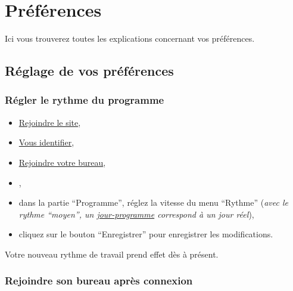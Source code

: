 % 
% 
% 
% 
% 
% 
% 
% 

\chapter{Préférences}\hypertarget{preferences-auteur}{}\label{preferences-auteur}

Ici vous trouverez toutes les explications concernant vos préférences.

\section{Réglage de vos préférences}\hypertarget{reglage-preferences}{}\label{reglage-preferences}

\subsection{Régler le rythme du programme}\hypertarget{regler-rythme}{}\label{regler-rythme}

\begin{itemize}
\item \hyperlink{rejoindre-site}{Rejoindre le site},
\item \hyperlink{vous-identifier}{Vous identifier},
\item \hyperlink{rejoindre-bureau}{Rejoindre votre bureau},
\item {},
\item dans la partie “Programme”, réglez la vitesse du menu “Rythme” (\emph{avec le rythme ``moyen'', un \hyperlink{explicationjourprogrammejourreel}{jour-programme} correspond à un jour réel}),
\item cliquez sur le bouton “Enregistrer'' pour enregistrer les modifications.
\end{itemize}

Votre nouveau rythme de travail prend effet dès à présent.

\subsection{Rejoindre son bureau après connexion}\hypertarget{rejoindre-bureau-apres-connexion}{}\label{rejoindre-bureau-apres-connexion}

